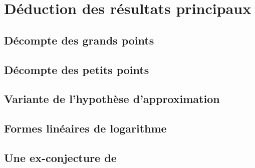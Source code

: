 
\chapter{Déduction des résultats principaux}

\section{Décompte des grands points}

\section{Décompte des petits points}

\section{Variante de l'hypothèse d'approximation}

\section{Formes linéaires de logarithme}

\section{Une ex-conjecture de }


\cleardoublepage
\endinput

